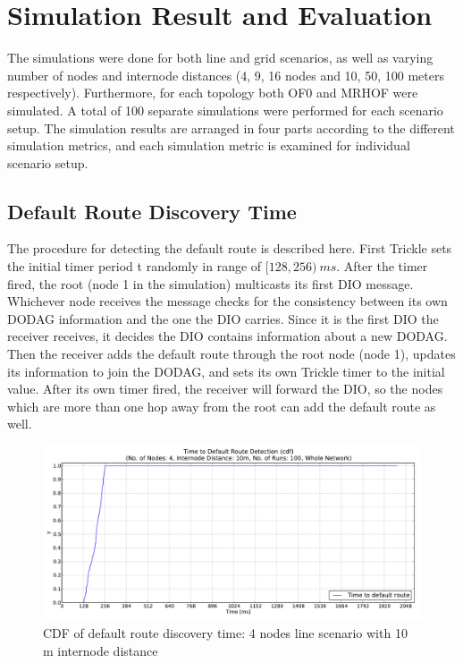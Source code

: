 \chapter{Simulation Result and Evaluation}
\label{ResultandEvaluation}

The simulations were done for both line and grid scenarios, as well as varying number of nodes and internode distances (4, 9, 16 nodes and 10, 50, 100 meters respectively). Furthermore, for each topology both OF0 and MRHOF were simulated. A total of 100 separate simulations were performed for each scenario setup. The simulation results are arranged in four parts according to the different simulation metrics, and each simulation metric is examined for individual scenario setup. 

\section{Default Route Discovery Time}
\label{default route}

The procedure for detecting the default route is described here. First Trickle sets the initial timer period t randomly in range of $[128,256)\:ms$\@. After the timer fired, the root (node 1 in the simulation) multicasts its first DIO message. Whichever node receives the message checks for the consistency between its own DODAG information and the one the DIO carries. Since it is the first DIO the receiver receives, it decides the DIO contains information about a new DODAG. Then the receiver adds the default route through the root node (node 1)\@, updates its information to join the DODAG, and sets its own Trickle timer to the initial value. After its own timer fired, the receiver will forward the DIO, so the nodes which are more than one hop away from the root can add the default route as well.
\begin{figure}[htbp]
  \begin{center}
    \leavevmode
      \includegraphics[scale=0.38]
      {Pics/results/4/MRHOF/line/dist10_montecarlo_cdf_hist.pdf}
   \caption{CDF of default route discovery time: 4 nodes line scenario with 10 m internode distance}
    \label{fig:dist10_montecarlo_cdf_hist}
  \end{center}
\end{figure}

